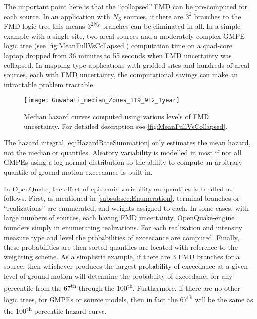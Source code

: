 \documentclass{article}
\begin{document}
The important point here is that the ``collapsed'' FMD can be pre-computed for each source. 
In an application with $N_S$ sources, if there are $3^2$ branches to the FMD logic tree this means $3^{2 N_S}$ branches can be eliminated in all. 
In a simple example with a single site, two areal sources and a moderately complex GMPE logic tree (see \autoref{fig:MeanFullVsCollapsed}) computation time on a quad-core laptop dropped from 36 minutes to 55 seconds when FMD uncertainty was collapsed. 
In mapping type applications with gridded sites and hundreds of areal sources, each with FMD uncertainty, the computational savings can make an intractable problem tractable. 

\begin{figure}
\begin{adjustbox}{center}
\texttt{[image: Guwahati\_median\_Zones\_119\_912\_1year]}
\end{adjustbox}
\caption[Median hazard curves computed using various levels of FMD uncertainty]{Median hazard curves computed using various levels of FMD uncertainty. 
For detailed description see \autoref{fig:MeanFullVsCollapsed}.} 
\label{fig:MedianFullVsCollapsed}
\end{figure}

The hazard integral \eqref{eq:HazardRateSummation} only estimates the mean hazard, not the median or quantiles. 
Aleatory variability is modelled in most if not all GMPEs using a log-normal distribution so the ability to compute an arbitrary quantile of ground-motion exceedance is built-in. 

In OpenQuake, the effect of epistemic variability on quantiles is handled as follows.
First, as mentioned in \autoref{subsubsec:Enumeration}, terminal branches or ``realizations'' are enumerated, and  weights assigned to each. 
In some cases, with large numbers of sources, each having FMD uncertainty, OpenQuake-engine founders simply in enumerating realizations. 
For each realization and intensity measure type and level the probabilities of exceedance are computed. 
Finally, these probabilities are then sorted quantiles are located with reference to the weighting scheme. 
As a simplistic example, if there are 3 FMD branches for a source, then whichever produces the largest probability of exceedance at a given level of ground motion will determine the probability of exceedance for any percentile from the 67\textsuperscript{th} through the 100\textsuperscript{th}. 
Furthermore, if there are no other logic trees, for GMPEs or source models, then in fact the 67\textsuperscript{th} will be the same as the 100\textsuperscript{th} percentile hazard curve.
\end{document}
